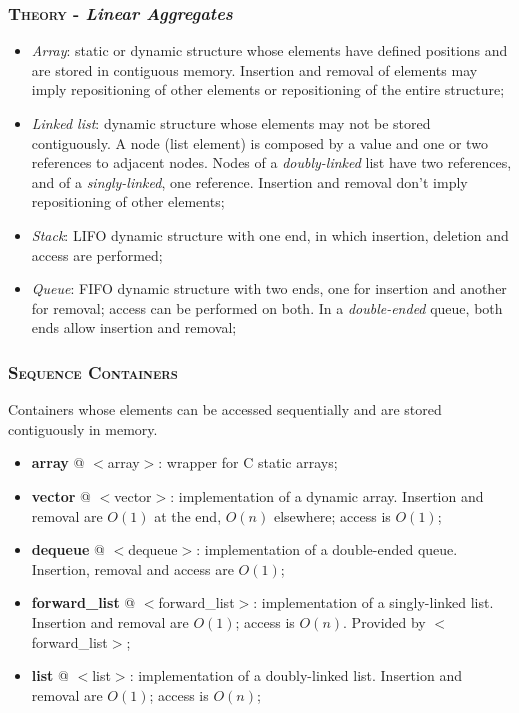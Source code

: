\documentclass[10pt]{article}
\begin{document}
\begin{multicols*}{5}
{\subsubsection*{\textsc{Theory} - \emph{Linear Aggregates}} 

\begin{itemize}[leftmargin=*,topsep=0.25pt]
  \setlength\itemsep{-1.8pt}
	\item \emph{Array}: static or dynamic structure whose elements have defined positions and are stored in contiguous memory. Insertion and removal of elements may imply repositioning of other elements or repositioning of the entire structure; 
	\item \emph{Linked list}: dynamic structure whose elements may not be stored contiguously. A node (list element) is composed by a value and one or two references to adjacent nodes. Nodes of a \emph{doubly-linked} list have two references, and of a \emph{singly-linked}, one reference. Insertion and removal don't imply repositioning of other elements;
	\item \emph{Stack}: LIFO dynamic structure with one end, in which insertion, deletion and access are performed;
	\item \emph{Queue}: FIFO dynamic structure with two ends, one for insertion and another for removal; access can be performed on both. In a \emph{double-ended} queue, both ends allow insertion and removal;  
\end{itemize}

\subsubsection*{\textsc{Sequence Containers}} 
\noindent
Containers whose elements can be accessed sequentially and are stored contiguously in memory.

\begin{itemize}[leftmargin=*,topsep=0.25pt]
  \setlength\itemsep{-1.8pt}
	\item \textbf{array} @ $<$array$>$: wrapper for C static arrays;
	\item \textbf{vector} @ $<$vector$>$: implementation of a dynamic array. Insertion and removal are $O(1)$ at the end, $O(n)$ elsewhere; access is $O(1)$;
	\item \textbf{dequeue} @ $<$dequeue$>$: implementation of a double-ended queue. Insertion, removal and access are $O(1)$;
	\item \textbf{forward\_list} @ $<$forward\_list$>$: implementation of a singly-linked list. Insertion and removal are $O(1)$; access is $O(n)$. Provided by $<$forward\_list$>$;  
	\item \textbf{list} @ $<$list$>$: implementation of a doubly-linked list. Insertion and removal are $O(1)$; access is $O(n)$;
\end{itemize}

}
\end{multicols*}
\end{document}
